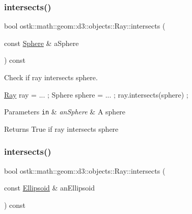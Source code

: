 \subsubsection{\texorpdfstring{intersects()}{intersects()}\hspace{0.1cm}{\footnotesize\ttfamily [3/4]}}
{\footnotesize\ttfamily bool ostk\+::math\+::geom\+::d3\+::objects\+::\+Ray\+::intersects (\begin{DoxyParamCaption}\item[{const \hyperlink{classostk_1_1math_1_1geom_1_1d3_1_1objects_1_1_sphere}{Sphere} \&}]{a\+Sphere }\end{DoxyParamCaption}) const}



Check if ray intersects sphere. 


\begin{DoxyCode}
\hyperlink{classostk_1_1math_1_1geom_1_1d3_1_1objects_1_1_ray_a78335698f8a4f72e613e607b13121df0}{Ray} ray = ... ;
Sphere sphere = ... ;
ray.intersects(sphere) ;
\end{DoxyCode}



\begin{DoxyParams}[1]{Parameters}
\mbox{\tt in}  & {\em an\+Sphere} & A sphere \\
\hline
\end{DoxyParams}
\begin{DoxyReturn}{Returns}
True if ray intersects sphere 
\end{DoxyReturn}
\mbox{\label{classostk_1_1math_1_1geom_1_1d3_1_1objects_1_1_ray_a48652010593cea440e028d9c02195108}} 
\subsubsection{\texorpdfstring{intersects()}{intersects()}\hspace{0.1cm}{\footnotesize\ttfamily [4/4]}}
{\footnotesize\ttfamily bool ostk\+::math\+::geom\+::d3\+::objects\+::\+Ray\+::intersects (\begin{DoxyParamCaption}\item[{const \hyperlink{classostk_1_1math_1_1geom_1_1d3_1_1objects_1_1_ellipsoid}{Ellipsoid} \&}]{an\+Ellipsoid }\end{DoxyParamCaption}) const}



